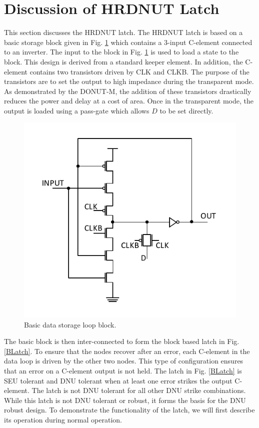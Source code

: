 \section{Discussion of HRDNUT Latch} \label{Proposed}

This section discusses the HRDNUT latch. The HRDNUT latch is based on a basic storage block given in Fig. \ref{Block} which contains a 3-input C-element connected to an inverter. The input to the block in Fig. \ref{Block} is used to load a state to the block. This design is derived from a standard keeper element. In addition, the C-element contains two transistors driven by CLK and CLKB. The purpose of the transistors are to set the output to high impedance during the transparent mode. As demonstrated by the DONUT-M, the addition of these transistors drastically reduces the power and delay at a cost of area. Once in the transparent mode, the output is loaded using a pass-gate which allows $D$ to be set directly.     

\begin{figure}[h]
	\centering
	\includegraphics[trim = 0mm 5mm 0mm 5mm, clip, width=0.5\linewidth]{Figures/Block}
	\caption{Basic data storage loop block.}
	\label{Block}
\end{figure} 

The basic block is then inter-connected to form the block based latch in Fig. \ref{BLatch}. To ensure that the nodes recover after an error, each C-element in the data loop is driven by the other two nodes. This type of configuration ensures that an error on a C-element output is not held. The latch in Fig. \ref{BLatch} is SEU tolerant and DNU tolerant when at least one error strikes the output C-element. The latch is not DNU tolerant for all other DNU strike combinations. While this latch is not DNU tolerant or robust, it forms the basis for the DNU robust design. To demonstrate the functionality of the latch, we will first describe its operation during normal operation.

